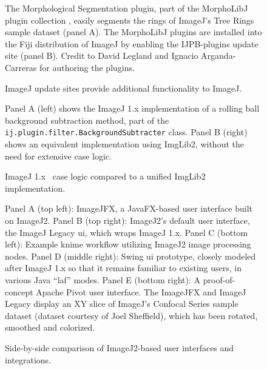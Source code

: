 \documentclass{bmcart}
\begin{document}
\begin{backmatter}
  \begin{figure}[h!]
    \caption{ImageJ update sites provide additional functionality to ImageJ.}
    \begin{flushleft}
      The Morphological Segmentation plugin, part of the MorphoLibJ plugin
      collection \cite{morpholibj}, easily segments the rings of ImageJ's Tree
      Rings sample dataset (panel A). The MorphoLibJ plugins are installed into
      the Fiji distribution of ImageJ by enabling the IJPB-plugins update site
      (panel B). Credit to David Legland and Ignacio Arganda-Carreras for
      authoring the plugins.
    \end{flushleft}
  \end{figure}

  \begin{figure}[h!]
    \caption{ImageJ 1.x ~case logic compared to a unified ImgLib2
    implementation.}
    \begin{flushleft}
      Panel A (left) shows the ImageJ 1.x implementation of a rolling ball
      background subtraction method, part of the
      \texttt{ij.plugin.filter.BackgroundSubtracter} class. Panel B (right)
      shows an equivalent implementation using ImgLib2, without the need for
      extensive case logic.
    \end{flushleft}
  \end{figure}

  \begin{figure}[h!]
    \caption{Side-by-side comparison of ImageJ2-based user interfaces
    and integrations.}
    \begin{flushleft}
      Panel A (top left): ImageJFX, a JavaFX-based user interface built on
      ImageJ2. Panel B (top right): ImageJ2's default user interface, the
      ImageJ Legacy \acrshort{ui}, which wraps ImageJ 1.x. Panel C (bottom
      left): Example \acrshort{knime} workflow utilizing ImageJ2 image
      processing nodes. Panel D (middle right): Swing \acrshort{ui} prototype,
      closely modeled after ImageJ 1.x so that it remains familiar to existing
      users, in various Java ``\acrlong{laf}'' modes. Panel E (bottom right): A
      proof-of-concept Apache Pivot user interface. The ImageJFX and ImageJ
      Legacy  display an XY slice of ImageJ's Confocal Series
      sample dataset (dataset courtesy of Joel Sheffield), which has been
      rotated, smoothed and colorized.
    \end{flushleft}
  \end{figure}


\end{backmatter}
\end{document}
